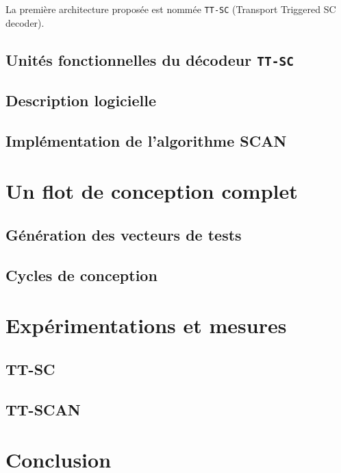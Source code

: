 La première architecture proposée est nommée \texttt{TT-SC} (Transport Triggered SC decoder). 

\subsection{Unités fonctionnelles du décodeur \texttt{TT-SC}}
\subsection{Description logicielle}
\subsection{Implémentation de l'algorithme SCAN}

\section{Un flot de conception complet}

\subsection{Génération des vecteurs de tests}
\subsection{Cycles de conception}

\section{Expérimentations et mesures}

\subsection{TT-SC}
\subsection{TT-SCAN}


\section*{Conclusion}


